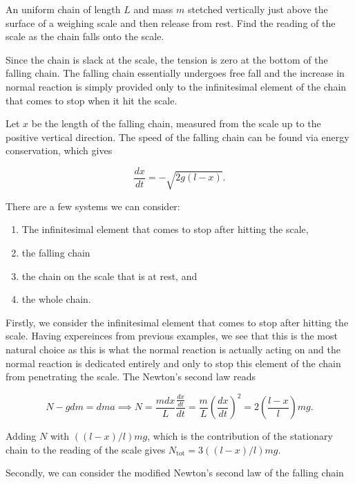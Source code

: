 \documentclass[a4paper,12pt]{report}
\begin{document}
{An uniform chain of length \(L\) and mass \(m\) stetched vertically just above the surface of a weighing scale and then release from rest. Find the reading of the scale as the chain falls onto the scale.}
{Since the chain is slack at the scale, the tension is zero at the bottom of the falling chain. The falling chain essentially undergoes free fall and the increase in normal reaction is simply provided only to the infinitesimal element of the chain that comes to stop when it hit the scale. 

Let \(x\) be the length of the falling chain, measured from the scale up to the positive vertical direction. The speed of the falling chain can be found via energy conservation, which gives 

\begin{equation}
	\frac{dx}{dt} = -\sqrt{2g(l-x)}.  
\end{equation}

There are a few systems we can consider: 

\begin{enumerate}
	\item The infinitesimal element that comes to stop after hitting the scale,
	\item the falling chain
	\item the chain on the scale that is at rest, and
	\item the whole chain.
\end{enumerate}

Firstly, we consider the infinitesimal element that comes to stop after hitting the scale. Having expereinces from previous examples, we see that this is the most natural choice as this is what the normal reaction is actually acting on and the normal reaction is dedicated entirely and only to stop this element of the chain from penetrating the scale. The Newton's second law reads

\begin{equation}
	N - gdm = dma \implies N = \frac{mdx}{L}\frac{\frac{dx}{dt} }{dt} = \frac{m}{L}\left( \frac{dx}{dt}  \right)^2 = 2\left( \frac{l-x}{l}  \right)mg. 
\end{equation}

Adding \(N\) with \(((l-x) /l) mg\), which is the contribution of the stationary chain to the reading of the scale gives \(N_{\text{tot} } = 3 \left( (l-x) /l \right)mg\).   

Secondly, we can consider the modified Newton's second law of the falling chain 

}
\end{document}
